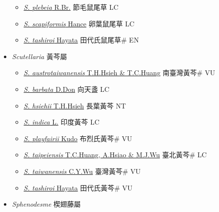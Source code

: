 \begin{itemize}
\begin{itemize}
        \item[] \href{http://www.theplantlist.org/tpl1.1/search?q=Salvia+plebeia}{\textit{S. plebeia} R.Br.}   節毛鼠尾草 LC
        \item[] \href{http://www.theplantlist.org/tpl1.1/search?q=Salvia+scapiformis}{\textit{S. scapiformis} Hance}   卵葉鼠尾草 LC
        \item[] \href{http://www.theplantlist.org/tpl1.1/search?q=Salvia+tashiroi}{\textit{S. tashiroi} Hayata}   田代氏鼠尾草\# EN
  \end{itemize}
 \item[] \textit{Scutellaria} 黃芩屬
                    
  \begin{itemize}
        \item[] \href{http://www.theplantlist.org/tpl1.1/search?q=Scutellaria+austrotaiwanensis}{\textit{S. austrotaiwanensis} T.H.Hsieh \& T.C.Huang}   南臺灣黃芩\# VU
        \item[] \href{http://www.theplantlist.org/tpl1.1/search?q=Scutellaria+barbata}{\textit{S. barbata} D.Don}   向天盞 LC
        \item[] \href{http://www.theplantlist.org/tpl1.1/search?q=Scutellaria+hsiehii}{\textit{S. hsiehii} T.H.Hsieh}   長葉黃芩 NT
        \item[] \href{http://www.theplantlist.org/tpl1.1/search?q=Scutellaria+indica}{\textit{S. indica} L.}   印度黃芩 LC
        \item[] \href{http://www.theplantlist.org/tpl1.1/search?q=Scutellaria+playfairii}{\textit{S. playfairii} Kudo}   布烈氏黃芩\# VU
        \item[] \href{http://www.theplantlist.org/tpl1.1/search?q=Scutellaria+taipeiensis}{\textit{S. taipeiensis} T.C.Huang, A.Hsiao \& M.J.Wu}   臺北黃芩\# LC
        \item[] \href{http://www.theplantlist.org/tpl1.1/search?q=Scutellaria+taiwanensis}{\textit{S. taiwanensis} C.Y.Wu}   臺灣黃芩\# VU
        \item[] \href{http://www.theplantlist.org/tpl1.1/search?q=Scutellaria+tashiroi}{\textit{S. tashiroi} Hayata}   田代氏黃芩\# VU
  \end{itemize}
 \item[] \textit{Sphenodesme} 楔翅藤屬
                    

\end{itemize}
